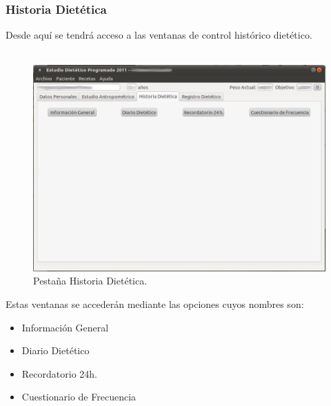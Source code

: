 \subsubsection{Historia Dietética}
Desde aquí se tendrá acceso a las ventanas de control histórico dietético.\\\\
\begin{figure}[H]
  \label{paciente_hist}
  \begin{center}
    \includegraphics[scale=0.5]{../../Image/paciente-hist.png}
  \end{center}
  \caption{Pestaña Historia Dietética.}
\end{figure}

Estas ventanas se accederán mediante las opciones cuyos nombres son:
\begin{itemize}
\item Información General
\item Diario Dietético
\item Recordatorio 24h.
\item Cuestionario de Frecuencia
\end{itemize}

